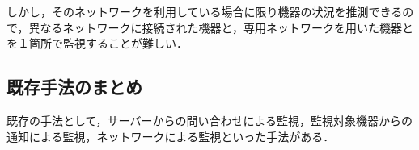 	しかし，そのネットワークを利用している場合に限り機器の状況を推測できるので，異なるネットワークに接続された機器と，専用ネットワークを用いた機器とを１箇所で監視することが難しい．

\subsection{既存手法のまとめ}
	既存の手法として，サーバーからの問い合わせによる監視，監視対象機器からの通知による監視，ネットワークによる監視といった手法がある．

